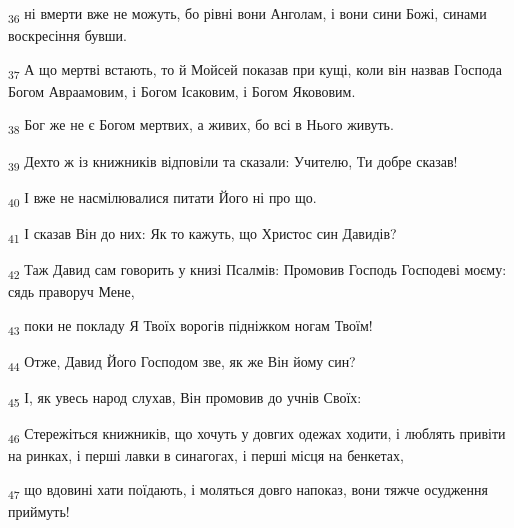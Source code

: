 \begin{tcolorbox}
\textsubscript{36} ні вмерти вже не можуть, бо рівні вони Анголам, і вони сини Божі, синами воскресіння бувши.
\end{tcolorbox}
\begin{tcolorbox}
\textsubscript{37} А що мертві встають, то й Мойсей показав при кущі, коли він назвав Господа Богом Авраамовим, і Богом Ісаковим, і Богом Якововим.
\end{tcolorbox}
\begin{tcolorbox}
\textsubscript{38} Бог же не є Богом мертвих, а живих, бо всі в Нього живуть.
\end{tcolorbox}
\begin{tcolorbox}
\textsubscript{39} Дехто ж із книжників відповіли та сказали: Учителю, Ти добре сказав!
\end{tcolorbox}
\begin{tcolorbox}
\textsubscript{40} І вже не насмілювалися питати Його ні про що.
\end{tcolorbox}
\begin{tcolorbox}
\textsubscript{41} І сказав Він до них: Як то кажуть, що Христос син Давидів?
\end{tcolorbox}
\begin{tcolorbox}
\textsubscript{42} Таж Давид сам говорить у книзі Псалмів: Промовив Господь Господеві моєму: сядь праворуч Мене,
\end{tcolorbox}
\begin{tcolorbox}
\textsubscript{43} поки не покладу Я Твоїх ворогів підніжком ногам Твоїм!
\end{tcolorbox}
\begin{tcolorbox}
\textsubscript{44} Отже, Давид Його Господом зве, як же Він йому син?
\end{tcolorbox}
\begin{tcolorbox}
\textsubscript{45} І, як увесь народ слухав, Він промовив до учнів Своїх:
\end{tcolorbox}
\begin{tcolorbox}
\textsubscript{46} Стережіться книжників, що хочуть у довгих одежах ходити, і люблять привіти на ринках, і перші лавки в синагогах, і перші місця на бенкетах,
\end{tcolorbox}
\begin{tcolorbox}
\textsubscript{47} що вдовині хати поїдають, і моляться довго напоказ, вони тяжче осудження приймуть!
\end{tcolorbox}
